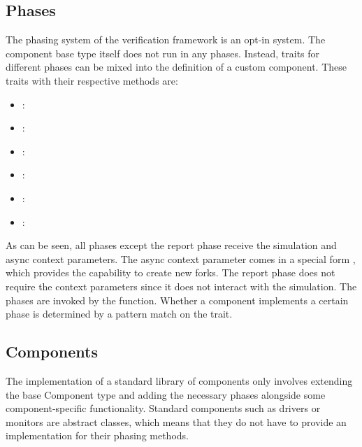 \subsection{Phases} %

The phasing system of the verification framework is an opt-in system. The component base type itself does not run in
any phases. Instead, traits for different phases can be mixed into the definition of a custom component. These traits
with their respective methods are:

\begin{itemize}
  \item {}: \\ 
  \item {}: \\ 
  \item {}: \\ 
  \item {}: \\ 
  \item {}: \\ 
  \item {}: \\ 
\end{itemize}

As can be seen, all phases except the report phase receive the simulation and async context parameters. The async
context parameter comes in a special form , which provides the capability to create new forks. The
report phase does not require the context parameters since it does not interact with the simulation. The phases are
invoked by the  function. Whether a component implements a certain phase is determined by a pattern
match on the trait.

\subsection{Components} %

The implementation of a standard library of components only involves extending the base Component type and adding the
necessary phases alongside some component-specific functionality. Standard components such as drivers or monitors are
abstract classes, which means that they do not have to provide an implementation for their phasing methods.

